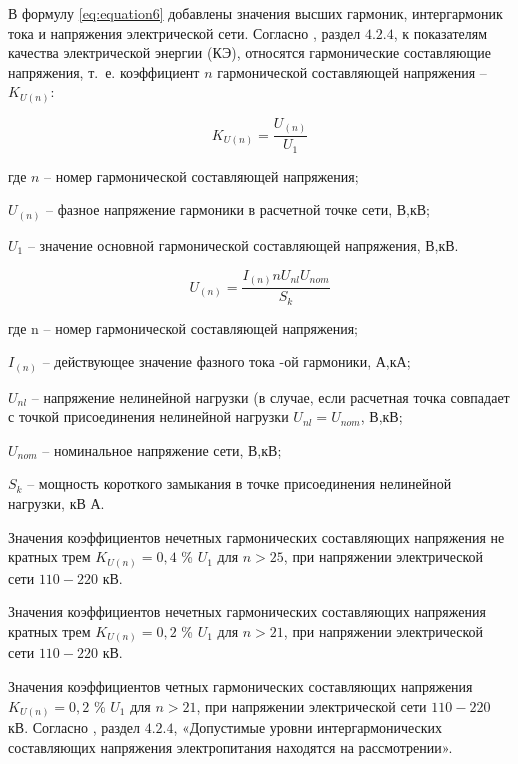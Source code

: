 В формулу \ref{eq:equation6} добавлены значения высших гармоник, интергармоник тока и напряжения электрической сети.
Согласно \cite{GOST32144-2013}, раздел $4.2.4$, к показателям качества электрической энергии (КЭ), относятся гармонические составляющие напряжения, т.~е. коэффициент  $n$ гармонической составляющей напряжения – $K_{U(n)}$:

\begin{equation}
	\label{eq:equation7}
K_{U(n)} = \frac{U_{(n)}}{U_1}
\end{equation}

где $n$ – номер гармонической составляющей напряжения;
 
$U_{(n)}$ – фазное напряжение гармоники в расчетной точке сети, В,кВ;

$U_1$ – значение основной гармонической составляющей напряжения, В,кВ.

\begin{equation}
	\label{eq:equation8}
	U_(n) = \frac{I_{(n)} n U_{nl} U_{nom}}{S_k}
\end{equation}

где n – номер гармонической составляющей напряжения;

$I_{(n)}$ – действующее значение фазного тока -ой гармоники, А,кА;

$U_{nl}$ – напряжение нелинейной нагрузки (в случае, если расчетная точка совпадает с точкой присоединения нелинейной нагрузки $U_{nl} = U_{nom}$, В,кВ;

$U_{nom}$ – номинальное напряжение сети, В,кВ;

$S_k$ – мощность короткого замыкания в точке присоединения нелинейной нагрузки, кВ А.

Значения коэффициентов нечетных гармонических составляющих напряжения не кратных трем $K_{U(n)}=0,4$ \% $U_1$ для $n>25$, при напряжении электрической сети $110-220$ кВ.

Значения коэффициентов нечетных гармонических составляющих напряжения кратных трем $K_{U(n)}=0,2$ \% $U_1$ для $n>21$, при напряжении электрической сети $110-220$ кВ.

Значения коэффициентов четных гармонических составляющих напряжения $K_{U(n)}=0,2$ \% $U_1$ для $n>21$, при напряжении электрической сети $110-220$ кВ.
Согласно \cite{GOST32144-2013}, раздел $4.2.4$, «Допустимые уровни интергармонических составляющих напряжения электропитания находятся на рассмотрении».

